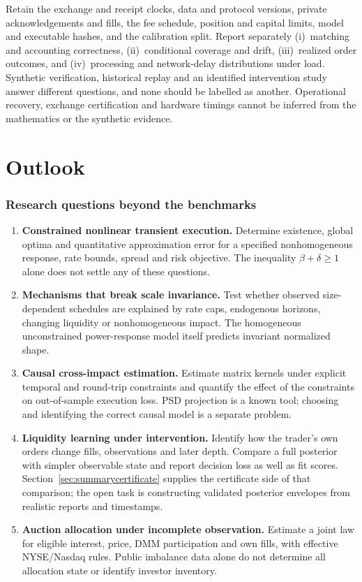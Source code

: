 \documentclass[11pt]{article}
\numberwithin{equation}{section}
\theoremstyle{definition}
\theoremstyle{remark}
\theoremstyle{definition}
\begin{document}
Retain the exchange and receipt clocks, data and protocol versions, private
acknowledgements and fills, the fee schedule, position and capital limits,
model and executable hashes, and the calibration split. Report separately
(i)~matching and accounting correctness, (ii)~conditional coverage and drift,
(iii)~realized order outcomes, and (iv)~processing and network-delay
distributions under load. Synthetic verification, historical replay and an
identified intervention study answer different questions, and none should be
labelled as another. Operational recovery, exchange certification and hardware
timings cannot be inferred from the mathematics or the synthetic evidence.


\part{Outlook}\label{pt:outlook}
\section{Research questions beyond the benchmarks}\label{sec:open}

\begin{enumerate}
\item \textbf{Constrained nonlinear transient execution.} Determine existence,
global optima and quantitative approximation error for a specified nonhomogeneous
response, rate bounds, spread and risk objective. The inequality
$\beta+\delta\geq1$ alone does not settle any of these questions.
\item \textbf{Mechanisms that break scale invariance.}\label{item:scaleinvariance} Test whether observed
size-dependent schedules are explained by rate caps, endogenous horizons,
changing liquidity or nonhomogeneous impact. The homogeneous unconstrained
power-response model itself predicts invariant normalized shape.
\item \textbf{Causal cross-impact estimation.} Estimate matrix kernels under
explicit temporal and round-trip constraints and quantify the effect of the
constraints on out-of-sample execution loss. PSD projection is a known tool;
choosing and identifying the correct causal model is a separate problem.
\item \textbf{Liquidity learning under intervention.} Identify how the trader's
own orders change fills, observations and later depth. Compare a full posterior
with simpler observable state and report decision loss as well as fit scores.
Section~\ref{sec:summarycertificate} supplies the certificate side of that
comparison; the open task is constructing validated posterior envelopes
from realistic reports and timestamps.
\item \textbf{Auction allocation under incomplete observation.} Estimate a joint
law for eligible interest, price, DMM participation and own fills, with effective
NYSE/Nasdaq rules. Public imbalance data alone do not determine all allocation
state or identify investor inventory.
\end{enumerate}
\end{document}
